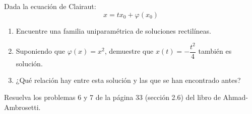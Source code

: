 \begin{ejercicio}
    Dada la ecuación de Clairaut:
    \begin{equation*}
        x = tx_0 + \varphi(x_0)
    \end{equation*}
    \begin{enumerate}
        \item Encuentre una familia uniparamétrica de soluciones rectilíneas.
        \item Suponiendo que \(\varphi(x) = x^2\), demuestre que \(x(t) = -\dfrac{t^2}{4}\) también es solución.
        \item ¿Qué relación hay entre esta solución y las que se han encontrado antes?
    \end{enumerate}
\end{ejercicio}

\begin{ejercicio}
    Resuelva los problemas 6 y 7 de la página 33 (sección 2.6) del libro de Ahmad-Ambrosetti.
\end{ejercicio}

